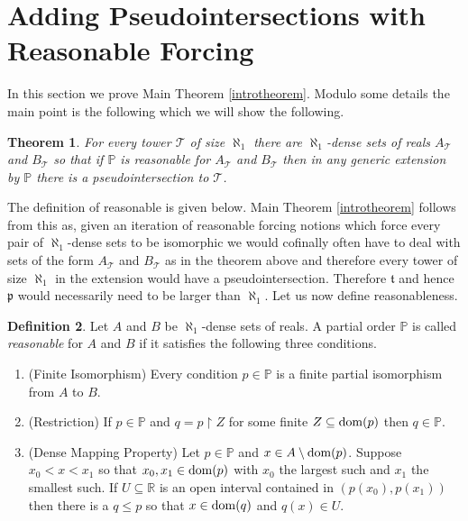 \documentclass[leqno,11pt]{amsart}
\newtheorem{theorem}{Theorem}[section]
\theoremstyle{definition}
\newtheorem{definition}[theorem]{Definition}
\theoremstyle{remark}
\def\hook{\upharpoonright}
\def\P{\mathbb P}
\begin{document}
\section{Adding Pseudointersections with Reasonable Forcing}

In this section we prove Main Theorem \ref{introtheorem}. Modulo some details the main point is the following which we will show the following.

\begin{theorem} \label{killing towers}
    For every tower $\mathcal T$ of size $\aleph_1$ there are $\aleph_1$-dense sets of reals $A_{\mathcal T}$ and $B_{\mathcal T}$ so that if $\P$ is reasonable for $A_{\mathcal T}$ and $B_{\mathcal T}$ then in any generic extension by $\P$ there is a pseudointersection to $\mathcal T$. \label{LOmain}
\end{theorem}

The definition of reasonable is given below. Main Theorem \ref{introtheorem} follows from this as, given an iteration of reasonable forcing notions which force every pair of $\aleph_1$-dense sets to be isomorphic we would cofinally often have to deal with sets of the form $A_\mathcal T$ and $B_\mathcal T$ as in the theorem above and therefore every tower of size $\aleph_1$ in the extension would have a pseudointersection. Therefore $\mathfrak{t}$ and hence $\mathfrak{p}$ would necessarily need to be larger than $\aleph_1$. Let us now define reasonableness. 

\begin{definition}
    
Let $A$ and $B$ be $\aleph_1$-dense sets of reals. A partial order $\P$ is called {\em reasonable} for $A$ and $B$ if it satisfies the following three conditions.
\begin{enumerate}
\item (Finite Isomorphism) Every condition $p \in \P$ is a finite partial isomorphism from $A$ to $B$. 
    \item (Restriction) If $p \in \P$ and $q = p \hook Z$ for some finite $Z \subseteq {\rm dom}(p)$ then $q \in \P$.
    \item (Dense Mapping Property) Let $p \in \P$ and $x \in A \setminus {\rm dom}(p)$. Suppose $x_0 < x < x_1$ so that $x_0, x_1 \in {\rm dom}(p)$ with $x_0$ the largest such and $x_1$ the smallest such. If $U \subseteq \mathbb R$ is an open interval contained in $(p(x_0), p(x_1))$ then there is a $q \leq p$ so that $x \in {\rm dom}(q)$ and $q(x) \in U$. %
\end{enumerate}

\end{definition}
\end{document}

